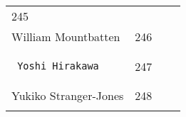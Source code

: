 \documentclass[]{article}
\begin{document}
\begin{longtable}[c]{@{}llll@{}}
\begin{minipage}[t]{0.10\columnwidth}
245
\end{minipage} & \begin{minipage}[t]{0.13\columnwidth}\raggedright
\end{minipage} & \begin{minipage}[t]{0.15\columnwidth}\raggedright
\end{minipage}
\\\noalign{\medskip}
\begin{minipage}[t]{0.39\columnwidth}\raggedright
William Mountbatten
\end{minipage} & \begin{minipage}[t]{0.10\columnwidth}\raggedright
246
\end{minipage} & \begin{minipage}[t]{0.13\columnwidth}\raggedright
\end{minipage} & \begin{minipage}[t]{0.15\columnwidth}\raggedright
\end{minipage}
\\\noalign{\medskip}
\begin{minipage}[t]{0.39\columnwidth}\raggedright
\begin{verbatim}
 Yoshi Hirakawa
\end{verbatim}
\end{minipage} & \begin{minipage}[t]{0.10\columnwidth}\raggedright
247
\end{minipage} & \begin{minipage}[t]{0.13\columnwidth}\raggedright
\end{minipage} & \begin{minipage}[t]{0.15\columnwidth}\raggedright
\end{minipage}
\\\noalign{\medskip}
\begin{minipage}[t]{0.39\columnwidth}\raggedright
Yukiko Stranger-Jones
\end{minipage} & \begin{minipage}[t]{0.10\columnwidth}\raggedright
248
\end{minipage} & \begin{minipage}[t]{0.13\columnwidth}\raggedright
\end{minipage} & \begin{minipage}[t]{0.15\columnwidth}\raggedright
\end{minipage}
\\\noalign{\medskip}
\begin{minipage}[t]{0.39\columnwidth}\raggedright

\end{minipage}
\end{longtable}
\end{document}
